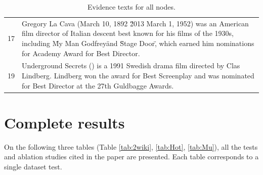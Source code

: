 \documentclass[11pt]{article}
\begin{document}
\begin{table}[t]
\begin{tabularx}{\textwidth}{c X}
17 & Gregory La Cava (March 10, 1892 \u2013 March 1, 1952) was an American film director of Italian descent best known for his films of the 1930s, including \"My Man Godfrey\" and \"Stage Door\", which earned him nominations for Academy Award for Best Director.\\

19 & Underground Secrets () is a 1991 Swedish drama film directed by Clas Lindberg. Lindberg won the award for Best Screenplay and was nominated for Best Director at the 27th Guldbagge Awards.\\

\bottomrule
\end{tabularx}
\caption{Evidence texts for all nodes.}
\label{tab:text_retrived}
\end{table}

\newpage

\section{Complete results}


\label{appendix:all_results}

On the following three tables (Table \ref{tab:2wiki}, \ref{tab:Hot}, \ref{tab:Mu}), all the tests and ablation studies cited in the paper are presented. Each table corresponds to a single dataset test.
\end{document}
